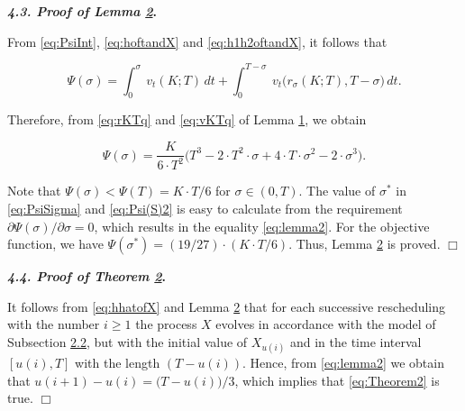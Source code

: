\textbf{\emph{4.3. Proof of Lemma \hyperlink{b:l2}{2}}.}

From \eqref{eq:PsiInt}, \eqref{eq:hoftandX} and \eqref{eq:h1h2oftandX}, it follows that

\begin{equation}\label{eq:Psi(S)1}

	\Psi(\sigma) = \int_{0}^{\sigma}\!\ {v_t}(K; T) \,dt + \int_{0}^{T-\sigma}\!\ {v_t}\big(r_{\sigma}(K; T), T - \sigma \big) \,dt.

\end{equation}

Therefore, from \eqref{eq:rKTq} and \eqref{eq:vKTq} of Lemma \hyperlink{b:l1}{1}, we obtain

\begin{equation}\label{eq:Psi(S)2}

	\Psi(\sigma) = {\frac{K}{6 \cdot T^2}}\big(T^3 - 2 \cdot T^2 \cdot \sigma + 4\cdot T\cdot{\sigma}^2 - 2\cdot{\sigma}^3 \big).

\end{equation}

Note that $\Psi(\sigma)<\Psi(T) = K\cdot T / 6$ for $\sigma \in (0, T)$. The value of $\sigma^*$ in \eqref{eq:PsiSigma} and \eqref{eq:Psi(S)2} is easy to calculate from the requirement $\partial \Psi (\sigma) / \partial \sigma = 0$, which results in the equality \eqref{eq:lemma2}. For the objective function, we have $\Psi(\sigma^*) = (19 / 27)\cdot(K\cdot T / 6)$. Thus, Lemma \hyperlink{b:l2}{2} is proved. \hfill $\Box$



\smallskip






\textbf{\emph{4.4. Proof of Theorem \hyperlink{b:Th2}{2}}.}

It follows from \eqref{eq:hhatofX} and Lemma \hyperlink{b:l2}{2} that for each successive rescheduling with the number $i\geq 1$ the process $X$ evolves in accordance with the model of Subsection \hyperlink{b:2.2}{2.2}, but with the initial value of $X_{u(i)}$ and in the time interval $[u(i), T]$ with the length $(T - u(i))$. Hence, from \eqref{eq:lemma2} we obtain that $u(i + 1) - u(i) = \big(T - u(i)\big) / 3$, which implies that \eqref{eq:Theorem2} is true. \hfill $\Box$





\smallskip



